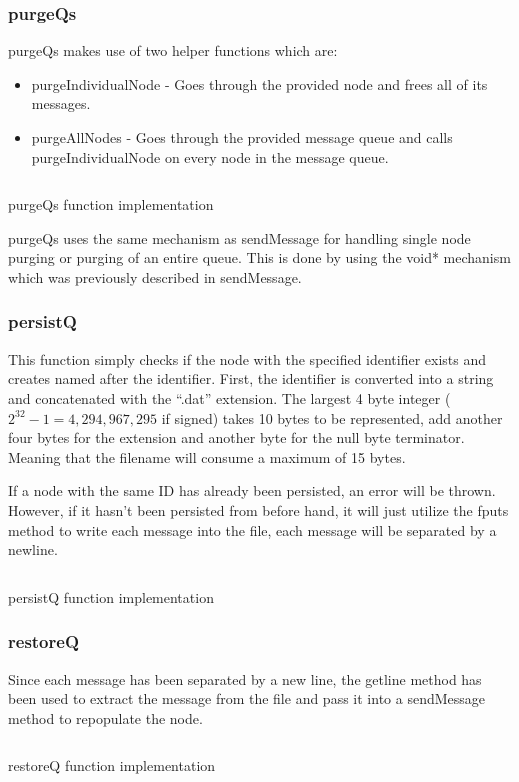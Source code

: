 \documentclass[a4paper, 12pt, titlepage]{article}
\newenvironment{code}{\captionsetup{type=listing}}{}
\newcommand{\sourcecode}[3]{
    \begin{code}
      \inputminted[linenos,numbersep=5pt,gobble=0,frame=lines,framesep=2mm,]{c}{#1}
        \caption{#2}
        \label{lst: #3}
    \end{code}
  }
\begin{document}
\begin{onehalfspacing}
  \subsubsection{purgeQs}
  purgeQs makes use of two helper functions which are:
  \begin{itemize}
  \item purgeIndividualNode - Goes through the provided node and frees all of its messages.
  \item purgeAllNodes - Goes through the provided message queue and calls purgeIndividualNode on every node in the message queue.
  \end{itemize}

  \sourcecode{snippets/purgeQs.c}{purgeQs function implementation}{purgeQs}

  purgeQs uses the same mechanism as sendMessage for handling single node purging or purging of an entire queue. This is done by using the void* mechanism which was previously described in sendMessage.



  \subsubsection{persistQ}
  This function simply checks if the node with the specified identifier exists and creates named after the identifier. First, the identifier is converted into a string and concatenated with the ``.dat'' extension. The largest 4 byte integer ($2^{32} - 1 = 4,294,967,295$ if signed) takes 10 bytes to be represented, add another four bytes for the extension and another byte for the null byte terminator. Meaning that the filename will consume a maximum of  15 bytes.

  If a node with the same ID has already been persisted, an error will be thrown. However, if it hasn't been persisted from before hand, it will just utilize the fputs method to write each message into the file, each message will be separated by a newline.

  \sourcecode{snippets/persistQ.c}{persistQ function implementation}{persistQ}
  \subsubsection{restoreQ}
  Since each message has been separated by a new line, the getline method has been used to extract the message from the file and pass it into a sendMessage method to repopulate the node.

  \sourcecode{snippets/restoreQ.c}{restoreQ function implementation}{restoreQ}


\end{onehalfspacing}
\end{document}

